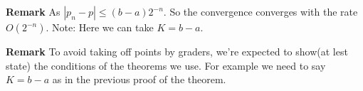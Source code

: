\documentclass[main.tex]{subfiles}
\begin{document}
\par \noindent \textbf{Remark} As $|p_n - p| \le (b - a) 2^{-n}$. So the convergence converges with the rate $O(2^{-n})$. Note: Here we can take $K = b - a$.
\par \noindent \textbf{Remark} To avoid taking off points by graders, we're expected to show(at lest state) the conditions of the theorems we use. For example we need to say $K = b - a $ as in the previous proof of the theorem. 
\end{document}
